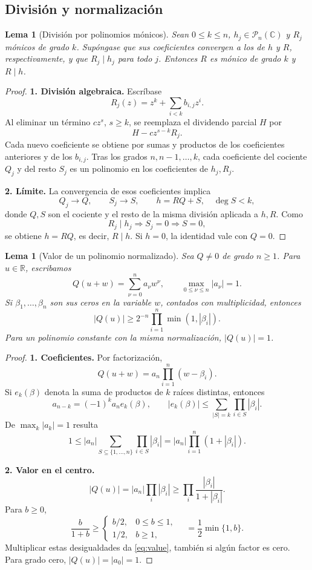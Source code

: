 \documentclass[11pt,a4paper]{article}
\numberwithin{equation}{section}
\newtheorem{lemma}[theorem]{Lema}
\theoremstyle{definition}
\theoremstyle{remark}
\newcommand{\R}{\mathbb R}
\newcommand{\C}{\mathbb C}
\newcommand{\PP}{\mathcal P}
\newcommand{\paso}[1]{\par\smallskip\noindent\textbf{#1}\quad}
\begin{document}
\subsection{División y normalización}
\begin{lemma}[División por polinomios mónicos]\label{lem:division}
Sean $0\le k\le n$, $h_j\in\PP_n(\C)$ y $R_j$ mónicos de grado $k$. Supóngase que sus coeficientes convergen a los de $h$ y $R$, respectivamente, y que $R_j\mid h_j$ para todo $j$. Entonces $R$ es mónico de grado $k$ y $R\mid h$.
\end{lemma}
\begin{proof}
\paso{1. División algebraica.}
Escríbase
\[
R_j(z)=z^k+\sum_{i<k}b_{i,j}z^i.
\]
Al eliminar un término $c z^s$, $s\ge k$, se reemplaza el dividendo parcial $H$ por
\[
H-cz^{s-k}R_j.
\]
Cada nuevo coeficiente se obtiene por sumas y productos de los coeficientes anteriores y de los $b_{i,j}$. Tras los grados $n,n-1,\ldots,k$, cada coeficiente del cociente $Q_j$ y del resto $S_j$ es un polinomio en los coeficientes de $h_j,R_j$.
\paso{2. Límite.}
La convergencia de esos coeficientes implica
\[
Q_j\longrightarrow Q,\qquad S_j\longrightarrow S,\qquad
h=RQ+S,\quad \deg S<k,
\]
donde $Q,S$ son el cociente y el resto de la misma división aplicada a $h,R$. Como
\[
R_j\mid h_j\Longrightarrow S_j=0\Longrightarrow S=0,
\]
se obtiene $h=RQ$, es decir, $R\mid h$. Si $h=0$, la identidad vale con $Q=0$.
\end{proof}

\begin{lemma}[Valor de un polinomio normalizado]\label{lem:value}
Sea $Q\ne0$ de grado $n\ge1$. Para $u\in\R$, escribamos
\[
Q(u+w)=\sum_{\nu=0}^na_\nu w^\nu,\qquad
\max_{0\le\nu\le n}|a_\nu|=1.
\]
Si $\beta_1,\ldots,\beta_n$ son sus ceros en la variable $w$, contados con multiplicidad, entonces
\begin{equation}\label{eq:value}
|Q(u)|\ge 2^{-n}\prod_{i=1}^{n}\min(1,|\beta_i|).
\end{equation}
Para un polinomio constante con la misma normalización, $|Q(u)|=1$.
\end{lemma}
\begin{proof}
\paso{1. Coeficientes.}
Por factorización,
\[
Q(u+w)=a_n\prod_{i=1}^n(w-\beta_i).
\]
Si $e_k(\beta)$ denota la suma de productos de $k$ raíces distintas, entonces
\[
a_{n-k}=(-1)^ka_ne_k(\beta),\qquad
|e_k(\beta)|\le\sum_{|S|=k}\prod_{i\in S}|\beta_i|.
\]
De $\max_k|a_k|=1$ resulta
\[
1\le |a_n|\sum_{S\subseteq\{1,\ldots,n\}}\prod_{i\in S}|\beta_i|
=|a_n|\prod_{i=1}^n(1+|\beta_i|).
\]
\paso{2. Valor en el centro.}
\[
|Q(u)|=|a_n|\prod_i|\beta_i|
\ge\prod_i\frac{|\beta_i|}{1+|\beta_i|}.
\]
Para $b\ge0$,
\[
\frac b{1+b}\ge
\begin{cases}b/2,&0\le b\le1,\\1/2,&b\ge1,
\end{cases}
\quad=\frac12\min\{1,b\}.
\]
Multiplicar estas desigualdades da \eqref{eq:value}, también si algún factor es cero. Para grado cero, $|Q(u)|=|a_0|=1$.
\end{proof}
\end{document}
